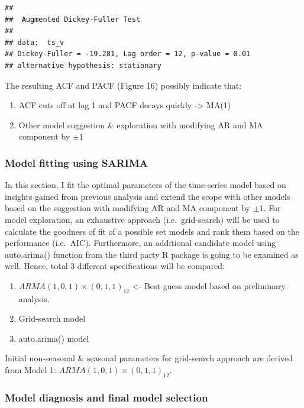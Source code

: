 \documentclass[
  11pt,
]{article}
\providecommand{\tightlist}{%
  \setlength{\itemsep}{0pt}\setlength{\parskip}{0pt}}
\begin{document}
\begin{verbatim}
## 
##  Augmented Dickey-Fuller Test
## 
## data:  ts_v
## Dickey-Fuller = -19.281, Lag order = 12, p-value = 0.01
## alternative hypothesis: stationary
\end{verbatim}

The resulting ACF and PACF (Figure 16) possibly indicate that:

\begin{enumerate}
\def\labelenumi{\arabic{enumi}.}
\tightlist
\item
  ACF cuts off at lag 1 and PACF decays quickly -\textgreater{} MA(1)
\item
  Other model suggestion \& exploration with modifying AR and MA
  component by \(\pm1\)
\end{enumerate}

\newpage

\hypertarget{model-fitting-using-sarima-1}{%
\subsubsection{Model fitting using
SARIMA}\label{model-fitting-using-sarima-1}}

In this section, I fit the optimal parameters of the time-series model
based on insights gained from previous analysis and extend the scope
with other models based on the suggestion with modifying AR and MA
component by \(\pm1\). For model exploration, an exhaustive approach
(i.e.~grid-search) will be used to calculate the goodness of fit of a
possible set models and rank them based on the performance (i.e.~AIC).
Furthermore, an additional candidate model using auto.arima() function
from the third party R package is going to be examined as well. Hence,
total 3 different specifications will be compared:

\begin{enumerate}
\def\labelenumi{\arabic{enumi}.}
\tightlist
\item
  \(ARMA(1,0,1)\times(0,1,1)_{12}\) \textless- Best guess model based on
  preliminary analysis.
\item
  Grid-search model
\item
  auto.arima() model
\end{enumerate}

Initial non-seasonal \& seasonal parameters for grid-search approach are
derived from Model 1: \(ARMA(1,0,1)\times(0,1,1)_{12}\).

\newpage

\hypertarget{model-diagnosis-and-final-model-selection-1}{%
\subsubsection{Model diagnosis and final model
selection}\label{model-diagnosis-and-final-model-selection-1}}
\end{document}
